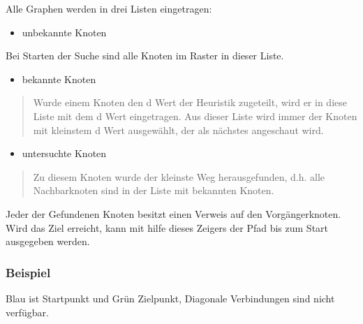 Alle Graphen werden in drei Listen eingetragen:

\begin{itemize}
\item
  unbekannte Knoten
\end{itemize}

Bei Starten der Suche sind alle Knoten im Raster in dieser Liste.

\begin{itemize}
\item
  bekannte Knoten
\end{itemize}

\begin{quote}
Wurde einem Knoten den d Wert der Heuristik zugeteilt, wird er in diese
Liste mit dem d Wert eingetragen. Aus dieser Liste wird immer der Knoten
mit kleinstem d Wert ausgewählt, der als nächstes angeschaut wird.
\end{quote}

\begin{itemize}
\item
  untersuchte Knoten
\end{itemize}

\begin{quote}
Zu diesem Knoten wurde der kleinste Weg herausgefunden, d.h. alle
Nachbarknoten sind in der Liste mit bekannten Knoten.
\end{quote}

Jeder der Gefundenen Knoten besitzt einen Verweis auf den
Vorgängerknoten. Wird das Ziel erreicht, kann mit hilfe dieses Zeigers
der Pfad bis zum Start ausgegeben werden.
\cite[Schmidt, Fuchs]{asterngeo}

\subsubsection{Beispiel}

Blau ist Startpunkt und Grün Zielpunkt, Diagonale Verbindungen sind
nicht verfügbar.



